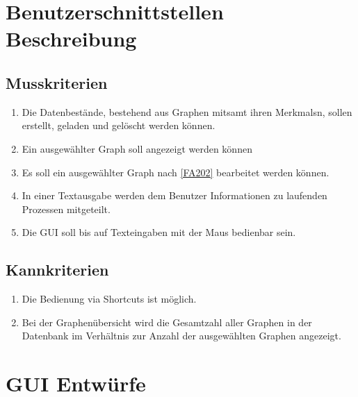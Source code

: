 \documentclass[13pt]{scrreprt}
\newcounter{tempcounter1}
\newcounter{tempcounter2}
\newcounter{tempcounter3}
\newcounter{tempcounter4}
\newcounter{tempcounter5}
\newcounter{tempcounter6}
\newcounter{tempcounter7}
\newcounter{tempcounter8}
\newcounter{tempcounter9}
\begin{document}
\section{Benutzerschnittstellen Beschreibung}
\subsection{Musskriterien}
\begin{addmargin}[25pt]{0pt}
\begin{enumerate} [label=B\arabic*00,start=1]
	\item Die Datenbestände, bestehend aus Graphen mitsamt ihren \Glspl{Merkmal}n, sollen erstellt, geladen und gelöscht werden können.
	\item Ein ausgewählter Graph soll angezeigt werden können
	\item Es soll ein ausgewählter Graph nach \ref{FA202} bearbeitet werden können. 
	\item In einer Textausgabe werden dem Benutzer Informationen zu laufenden Prozessen mitgeteilt.
	\item Die GUI soll bis auf Texteingaben mit der Maus bedienbar sein.
\setcounter{tempcounter9}{\value{enumi}}
\end{enumerate}
\end{addmargin}
\addtocounter{tempcounter9}{1}
\subsection{Kannkriterien}
\begin{addmargin}[25pt]{0pt}
\begin{enumerate} [label=B\arabic*00,start=\value{tempcounter9}]
	\item Die Bedienung via Shortcuts ist möglich.
	\item Bei der Graphenübersicht wird die Gesamtzahl aller Graphen in der Datenbank im Verhältnis zur Anzahl der ausgewählten Graphen angezeigt. 
\end{enumerate}
\end{addmargin}



\section{GUI Entwürfe}
\end{document}
